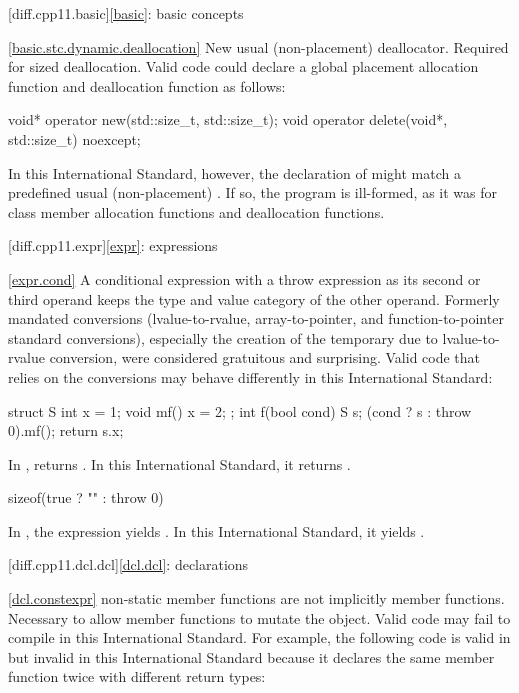 [diff.cpp11.basic]{\ref{basic}: basic concepts}

\ref{basic.stc.dynamic.deallocation}
\change New usual (non-placement) deallocator.
\rationale Required for sized deallocation.
\effect Valid \CppXI code could declare a global placement allocation function and
deallocation function as follows:

\begin{codeblock}
void* operator new(std::size_t, std::size_t);
void operator delete(void*, std::size_t) noexcept;
\end{codeblock}

In this International Standard, however, the declaration of 
might match a predefined usual (non-placement)
. If so, the
program is ill-formed, as it was for class member allocation functions and
deallocation functions.

[diff.cpp11.expr]{\ref{expr}: expressions}

\ref{expr.cond}
\change A conditional expression with a throw expression as its second or third
operand keeps the type and value category of the other operand.
\rationale Formerly mandated conversions (lvalue-to-rvalue,
array-to-pointer, and function-to-pointer
standard conversions), especially the creation of the temporary due to
lvalue-to-rvalue conversion, were considered gratuitous and surprising.
\effect Valid \CppXI code that relies on the conversions may behave differently
in this International Standard:

\begin{codeblock}
struct S {
  int x = 1;
  void mf() { x = 2; }
};
int f(bool cond) {
  S s;
  (cond ? s : throw 0).mf();
  return s.x;
}
\end{codeblock}

In \CppXI,  returns . In this International Standard,
it returns .

\begin{codeblock}
sizeof(true ? "" : throw 0)
\end{codeblock}

In \CppXI, the expression yields . In this
International Standard, it yields .

[diff.cpp11.dcl.dcl]{\ref{dcl.dcl}: declarations}

\ref{dcl.constexpr}
\change {} non-static member functions are not implicitly
 member functions.
\rationale Necessary to allow  member functions to mutate
the object.
\effect
Valid \CppXI code may fail to compile in this International Standard.
For example, the following code is valid in \CppXI
but invalid in this International Standard because it declares the same member
function twice with different return types:

